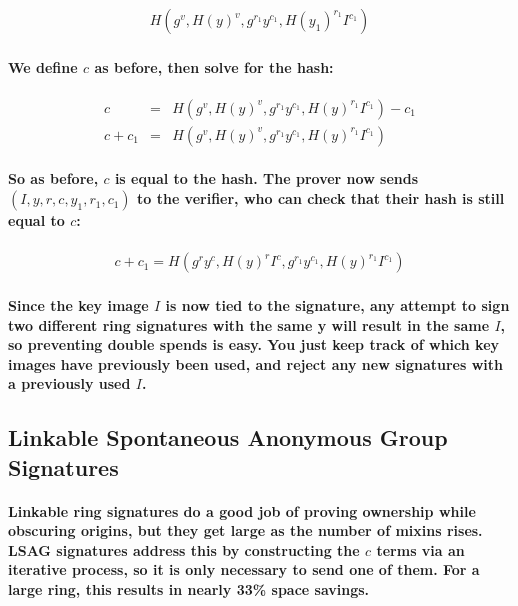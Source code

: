 \documentclass{article}
\begin{document}
\begin{eqnarray}
  H(g^v, H(y)^v, g^{r_1} y^{c_1}, H(y_1)^{r_1} I^{c_1})
\end{eqnarray}

\paragraph{We define $c$ as before, then solve for the hash:}

\begin{eqnarray}
  c &=& H(g^v, H(y)^v, g^{r_1} y^{c_1}, H(y)^{r_1} I^{c_1}) - c_1\\
  c + c_1 &=& H(g^v, H(y)^v, g^{r_1} y^{c_1}, H(y)^{r_1} I^{c_1})
\end{eqnarray}

\paragraph{So as before, $c$ is equal to the hash.  The prover now sends $(I, y, r, c, y_1, r_1, c_1)$ to the verifier, who can check that their hash is still equal to $c$:}

\begin{eqnarray}
  c + c_1 = H(g^r y^c, H(y)^r I^c, g^{r_1} y^{c_1}, H(y)^{r_1} I^{c_1})
\end{eqnarray}

\paragraph{Since the key image $I$ is now tied to the signature, any attempt to sign two different ring signatures with the same y will result in the same $I$, so preventing double spends is easy.  You just keep track of which key images have previously been used, and reject any new signatures with a previously used $I$.}


\subsection{Linkable Spontaneous Anonymous Group Signatures}

\paragraph{Linkable ring signatures do a good job of proving ownership while obscuring origins, but they get large as the number of mixins rises. LSAG signatures address this by constructing the $c$ terms via an iterative process, so it is only necessary to send one of them.  For a large ring, this results in nearly 33\% space savings.}
\end{document}

